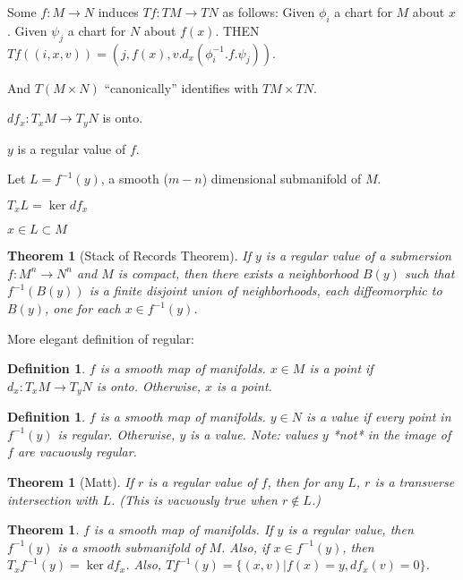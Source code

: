 \documentclass[11pt]{amsbook}
\newenvironment{dateenv}{
	\vspace{1em}
}{
	\vspace{1em}
}
\newcommand{\mydate}[4]{
	\newdate{#1}{#2}{#3}{#4}
	\begin{dateenv}
		\hfill\displaydate{#1}
	\end{dateenv}
}
\theoremstyle{mystyle} \newtheorem{thrm}[thm]{Theorem}
\theoremstyle{mystyle} \newtheorem{defi}[thm]{Definition}
\theoremstyle{mystyle} \newtheorem{coro}[thm]{Corollary}
\theoremstyle{mystyle} \newtheorem{propo}[thm]{Proposition}
\theoremstyle{mystyle} \newtheorem{lemm}[thm]{Lemma}
\numberwithin{thm}{section}
\begin{document}
Some $f: M \to N$ induces $Tf : TM \to TN$ as follows:
Given $\phi_i$ a chart for $M$ about $x$.
Given $\psi_j$ a chart for $N$ about $f(x)$.
THEN
$Tf((i, x, v)) = (j, f(x), v.d_x(\phi_i^{-1}.f.\psi_j))$.

And $T(M \times N)$ ``canonically'' identifies with $TM \times TN$.


\mydate{d2}{26}{9}{2016}



$df_x : T_xM \to T_yN$ is onto.

$y$ is a regular value of $f$.

Let $L = f^{-1}(y)$, a smooth ($m-n$) dimensional submanifold of $M$.

$T_xL = \ker df_x$

$x \in L \subset M$

\begin{thrm}[Stack of Records Theorem]
	If $y$ is a regular value of a submersion $f: M^n \to N^n$ and $M$ is compact, then there exists a neighborhood $B(y)$ such that $f^{-1}(B(y))$ is a finite disjoint union of neighborhoods, each diffeomorphic to $B(y)$, one for each $x \in f^{-1}(y)$.
\end{thrm}

\mydate{d3}{28}{9}{2016}

More elegant definition of regular:
\begin{defi}
	$f$ is a smooth map of manifolds.
	$x \in M$ is a  point if $d_x : T_xM \to T_yN$ is onto.  Otherwise, $x$ is a  point.
\end{defi}

\begin{defi}
	$f$ is a smooth map of manifolds.
	$y \in N$ is a  value if every point in $f^{-1}(y)$ is regular.  Otherwise, $y$ is a  value.  Note: values $y$ *not* in the image of $f$ are vacuously regular.
\end{defi}

\begin{thrm}[Matt]
	If $r$ is a regular value of $f$, then for any $L$, $r$ is a transverse intersection with $L$.  (This is vacuously true when $r \not\in L$.)
\end{thrm}

\begin{thrm}
	$f$ is a smooth map of manifolds.
	If $y$ is a regular value, then $f^{-1}(y)$ is a smooth submanifold of $M$.
	Also, if $x \in f^{-1}(y)$, then $T_xf^{-1}(y) = \ker df_x$.
	Also, $Tf^{-1}(y) = \{ (x,v) | f(x)=y, df_x(v) = 0\}$.
\end{thrm}
\end{document}
